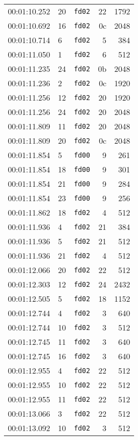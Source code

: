 \documentclass{article}
\begin{document}
\begin{longtable}{lllrr}
00:01:10.252 & 20 & \texttt{fd02} & 22 & 1792 \\
00:01:10.692 & 16 & \texttt{fd02} & 0c & 2048 \\
00:01:10.714 & 6 & \texttt{fd02} & 5 & 384 \\
00:01:11.050 & 1 & \texttt{fd02} & 6 & 512 \\
00:01:11.235 & 24 & \texttt{fd02} & 0b & 2048 \\
00:01:11.236 & 2 & \texttt{fd02} & 0c & 1920 \\
00:01:11.256 & 12 & \texttt{fd02} & 20 & 1920 \\
00:01:11.256 & 24 & \texttt{fd02} & 20 & 2048 \\
00:01:11.809 & 11 & \texttt{fd02} & 20 & 2048 \\
00:01:11.809 & 20 & \texttt{fd02} & 0c & 2048 \\
00:01:11.854 & 5 & \texttt{fd00} & 9 & 261 \\
00:01:11.854 & 18 & \texttt{fd00} & 9 & 301 \\
00:01:11.854 & 21 & \texttt{fd00} & 9 & 284 \\
00:01:11.854 & 23 & \texttt{fd00} & 9 & 256 \\
00:01:11.862 & 18 & \texttt{fd02} & 4 & 512 \\
00:01:11.936 & 4 & \texttt{fd02} & 21 & 384 \\
00:01:11.936 & 5 & \texttt{fd02} & 21 & 512 \\
00:01:11.936 & 21 & \texttt{fd02} & 4 & 512 \\
00:01:12.066 & 20 & \texttt{fd02} & 22 & 512 \\
00:01:12.303 & 12 & \texttt{fd02} & 24 & 2432 \\
00:01:12.505 & 5 & \texttt{fd02} & 18 & 1152 \\
00:01:12.744 & 4 & \texttt{fd02} & 3 & 640 \\
00:01:12.744 & 10 & \texttt{fd02} & 3 & 512 \\
00:01:12.745 & 11 & \texttt{fd02} & 3 & 640 \\
00:01:12.745 & 16 & \texttt{fd02} & 3 & 640 \\
00:01:12.955 & 4 & \texttt{fd02} & 22 & 512 \\
00:01:12.955 & 10 & \texttt{fd02} & 22 & 512 \\
00:01:12.955 & 11 & \texttt{fd02} & 22 & 512 \\
00:01:13.066 & 3 & \texttt{fd02} & 22 & 512 \\
00:01:13.092 & 10 & \texttt{fd02} & 3 & 512 \\

\end{longtable}
\end{document}
